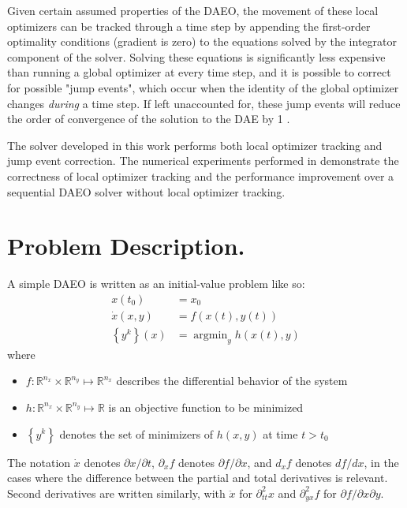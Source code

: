 \documentclass[twoside,leqno, twocolumn]{article}
\DeclareMathOperator*{\argmin}{\arg\min}
\newcommand{\bbR}{\ensuremath{\mathbb{R}}}
\begin{document}
Given certain assumed properties of the DAEO, the movement of these local optimizers can be tracked through a time step by appending the first-order optimality conditions (gradient is zero) to the equations solved by the integrator component of the solver. Solving these equations is significantly less expensive than running a global optimizer at every time step, and it is possible to correct for possible "jump events", which occur when the identity of the global optimizer changes \textit{during} a time step. If left unaccounted for, these jump events will reduce the order of convergence of the solution to the DAE by 1 \cite{deussenNumericalSimulationDifferentialalgebraic2023, mannshardtOnestepMethodsAny1978}.

The solver developed in this work performs both local optimizer tracking and jump event correction. The numerical experiments performed in  demonstrate the correctness of local optimizer tracking and the performance improvement over a sequential DAEO solver without local optimizer tracking.

\section{Problem Description.}
A simple DAEO is written as an initial-value problem like so:
\begin{equation} \label{eq:daeo-ivp}
\begin{aligned}
	x(t_0) &= x_0\\
	\dot{x}(x, y) &= f(x(t), y(t))\\
	\left\{y^k\right\}(x) &= \argmin_{y}h(x(t), y)
\end{aligned}
\end{equation}
where 
\begin{itemize}
	\item $f:\bbR^{n_x}\times\bbR^{n_y}\mapsto\bbR^{n_x}$ describes the differential behavior of the system
	\item $h:\bbR^{n_x}\times\bbR^{n_y}\mapsto\bbR$ is an objective function to be minimized
	\item $\left\{y^k\right\}$ denotes the set of minimizers of $h(x, y)$ at time $t>t_0$
\end{itemize}
The notation $\dot{x}$ denotes $\partial x/\partial t$, $\partial_x f$ denotes $\partial f/\partial x$, and $d_x f$ denotes $df/dx$, in the cases where the difference between the partial and total derivatives is relevant. Second derivatives are written similarly, with $\ddot{x}$ for $\partial^2_{tt} x$ and $\partial^2_{yx} f$ for $\partial f/\partial x\partial y$.
\end{document}
